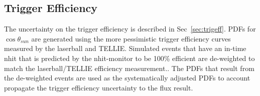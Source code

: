 \subsection{Trigger Efficiency}
The uncertainty on the trigger efficiency is described in Sec~\ref{sec:trigeff}.
PDFs for $\cos\theta_{sun}$ are generated using the more pessimistic
trigger efficiency curves measured by the laserball and TELLIE\@.
Simulated events that have an in-time nhit that is predicted by the nhit-monitor
to be 100\% efficient are de-weighted to match the laserball/TELLIE efficiency
measurement..
The PDFs that result from the de-weighted events are used as the systematically
adjusted PDFs to account propagate the trigger efficiency uncertainty to the
flux result.

